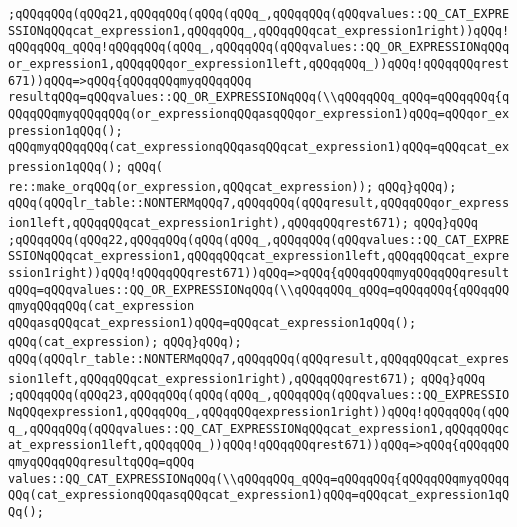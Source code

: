 \verb|;qQQqqQQq(qQQq21,qQQqqQQq(qQQq(qQQq_,qQQqqQQq(qQQqvalues::QQ_CAT_EXPRESSIONqQQqcat_expression1,qQQqqQQq_,qQQqqQQqcat_expression1right))qQQq!qQQqqQQq_qQQq!qQQqqQQq(qQQq_,qQQqqQQq(qQQqvalues::QQ_OR_EXPRESSIONqQQqor_expression1,qQQqqQQqor_expression1left,qQQqqQQq_))qQQq!qQQqqQQqrest671))qQQq=>qQQq{qQQqqQQqmyqQQqqQQq|\newline
\verb|resultqQQq=qQQqvalues::QQ_OR_EXPRESSIONqQQq(\\qQQqqQQq_qQQq=qQQqqQQq{qQQqqQQqmyqQQqqQQq(or_expressionqQQqasqQQqor_expression1)qQQq=qQQqor_expression1qQQq();|\newline
\verb|qQQqmyqQQqqQQq(cat_expressionqQQqasqQQqcat_expression1)qQQq=qQQqcat_expression1qQQq();|\newline
\verb|qQQq(|\newline
\verb|re::make_orqQQq(or_expression,qQQqcat_expression));|\newline
\verb|qQQq}qQQq);|\newline
\verb|qQQq(qQQqlr_table::NONTERMqQQq7,qQQqqQQq(qQQqresult,qQQqqQQqor_expression1left,qQQqqQQqcat_expression1right),qQQqqQQqrest671);|\newline
\verb|qQQq}qQQq|\newline
\verb|;qQQqqQQq(qQQq22,qQQqqQQq(qQQq(qQQq_,qQQqqQQq(qQQqvalues::QQ_CAT_EXPRESSIONqQQqcat_expression1,qQQqqQQqcat_expression1left,qQQqqQQqcat_expression1right))qQQq!qQQqqQQqrest671))qQQq=>qQQq{qQQqqQQqmyqQQqqQQqresultqQQq=qQQqvalues::QQ_OR_EXPRESSIONqQQq(\\qQQqqQQq_qQQq=qQQqqQQq{qQQqqQQqmyqQQqqQQq(cat_expression|\newline
\verb|qQQqasqQQqcat_expression1)qQQq=qQQqcat_expression1qQQq();|\newline
\verb|qQQq(cat_expression);|\newline
\verb|qQQq}qQQq);|\newline
\verb|qQQq(qQQqlr_table::NONTERMqQQq7,qQQqqQQq(qQQqresult,qQQqqQQqcat_expression1left,qQQqqQQqcat_expression1right),qQQqqQQqrest671);|\newline
\verb|qQQq}qQQq|\newline
\verb|;qQQqqQQq(qQQq23,qQQqqQQq(qQQq(qQQq_,qQQqqQQq(qQQqvalues::QQ_EXPRESSIONqQQqexpression1,qQQqqQQq_,qQQqqQQqexpression1right))qQQq!qQQqqQQq(qQQq_,qQQqqQQq(qQQqvalues::QQ_CAT_EXPRESSIONqQQqcat_expression1,qQQqqQQqcat_expression1left,qQQqqQQq_))qQQq!qQQqqQQqrest671))qQQq=>qQQq{qQQqqQQqmyqQQqqQQqresultqQQq=qQQq|\newline
\verb|values::QQ_CAT_EXPRESSIONqQQq(\\qQQqqQQq_qQQq=qQQqqQQq{qQQqqQQqmyqQQqqQQq(cat_expressionqQQqasqQQqcat_expression1)qQQq=qQQqcat_expression1qQQq();|\newline

